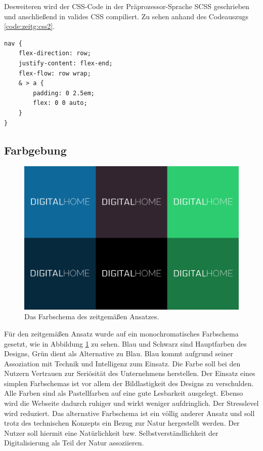 Desweiteren wird der CSS-Code in der Präprozessor-Sprache SCSS geschrieben und anschließend in valides CSS compiliert. Zu sehen anhand des Codeauszugs \ref{code:zeitg:css2}.

\begin{lstlisting}[caption=Verschachtelung von CSS-Klassen in SCSS., label=code:zeitg:css2]
nav {
	flex-direction: row;
	justify-content: flex-end;
	flex-flow: row wrap;
	& > a {
		padding: 0 2.5em;
		flex: 0 0 auto;
	}
}
\end{lstlisting}

\subsection{Farbgebung}
\begin{figure} [hp]
	\includegraphics[width=\textwidth]{./img/zeitg_farbschema1.png}
	\caption{Das Farbschema des zeitgemäßen Ansatzes.}
	\label{zeitg:farbschema}
\end{figure}

Für den zeitgemäßen Ansatz wurde auf ein monochromatisches Farbschema gesetzt, wie in Abbildung \ref{zeitg:farbschema} zu sehen. Blau und Schwarz sind Hauptfarben des Designs, Grün dient als Alternative zu Blau.
Blau kommt aufgrund seiner Assoziation mit Technik und Intelligenz zum Einsatz. Die Farbe soll bei den Nutzern Vertrauen zur Seriösität des Unternehmens herstellen. Der Einsatz eines simplen Farbschemas ist vor allem der Bildlastigkeit des Designs zu verschulden.
Alle Farben sind als Pastellfarben auf eine gute Lesbarkeit ausgelegt. Ebenso wird die Webseite dadurch ruhiger und wirkt weniger aufdringlich. Der Stresslevel wird reduziert.
Das alternative Farbschema ist ein völlig anderer Ansatz und soll trotz des technischen Konzepts ein Bezug zur Natur hergestellt werden. Der Nutzer soll hiermit eine Natürlichkeit bzw. Selbstverständlichkeit der Digitalisierung als Teil der Natur assoziieren.

